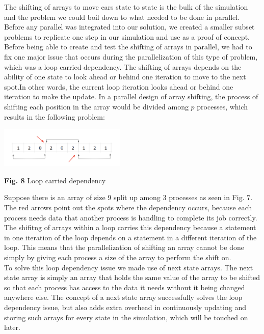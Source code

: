 \documentclass[conference]{IEEEtran}
\begin{document}
The shifting of arrays to move cars state to state is the bulk of the simulation and the problem we could boil down to what needed to be done in parallel. Before any parallel was integrated into our solution, we created a smaller subset problems to replicate one step in our simulation and use as a proof of concept.  \\

\hspace*{.2cm} Before being able to create and test the shifting of arrays in parallel, we had to fix one major issue that occurs during the parallelization of this type of problem, which was a loop carried dependency. The shifting of arrays depends on the ability of one state to look ahead or behind one iteration to move to the next spot.In other words, the current loop iteration looks ahead or behind one iteration to make the update. In a parallel design of array shifting, the process of shifting each position in the array would be divided among $p$ processes, which results in the following problem:

\includegraphics[width=0.45\textwidth]{dependency}
\begin{center}
	\textbf{Fig. 8} Loop carried dependency \\
\end{center}

Suppose there is an array of size 9 split up among 3 processes as seen in Fig. 7. The red arrows point out the spots where the dependency occurs, because each process needs data that another process is handling to complete its job correctly. The shifitng of arrays within a loop carries this dependency because a statement in one iteration of the loop depends on a statement in a different iteration of the loop. This means that the parallelization of shifting an array cannot be done simply by giving each process a size of the array to perform the shift on.  \\

\hspace*{.2cm} To solve this loop dependency issue we made use of next state arrays. The next state array is simply an array that holds the same value of the array to be shifted so that each process has access to the data it needs without it being changed anywhere else. The concept of a next state array successfully solves the loop dependency issue, but also adds extra overhead in continuously updating and storing such arrays for every state in the simulation, which will be touched on later. \\
\end{document}
